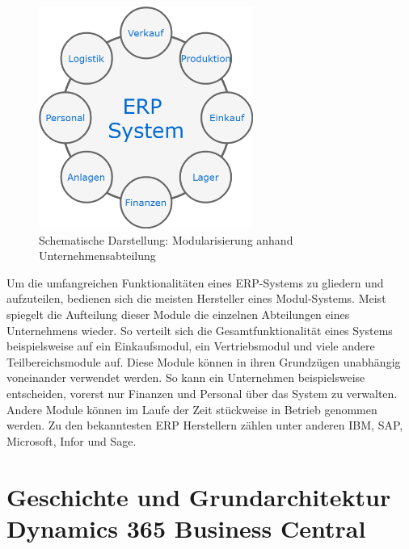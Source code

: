 \pagebreak

\begin{figure}[h]
	\centering
	\includegraphics[width=70mm]{images/ERPModules.png}
	\caption{Schematische Darstellung: Modularisierung anhand Unternehmensabteilung}
	\label{fig:Modulisierung}
\end{figure}

Um die umfangreichen Funktionalitäten eines ERP-Systems zu gliedern und aufzuteilen, bedienen sich die meisten Hersteller eines Modul-Systems. Meist spiegelt die Aufteilung dieser Module die einzelnen Abteilungen eines Unternehmens wieder. So verteilt sich die Gesamtfunktionalität eines Systems beispielsweise auf ein Einkaufsmodul, ein Vertriebsmodul und viele andere Teilbereichsmodule auf. 
Diese Module können in ihren Grundzügen unabhängig voneinander verwendet werden. So kann ein Unternehmen beispielsweise entscheiden, vorerst nur Finanzen und Personal über das System zu verwalten. Andere Module können im Laufe der Zeit stückweise in Betrieb genommen werden. Zu den bekanntesten ERP Herstellern zählen unter anderen IBM, SAP, Microsoft, Infor und Sage.

\pagebreak
\section{Geschichte und Grundarchitektur Dynamics 365 Business Central}
\label{sec:Grundarchitektur Dynamics 365 Business Central}

